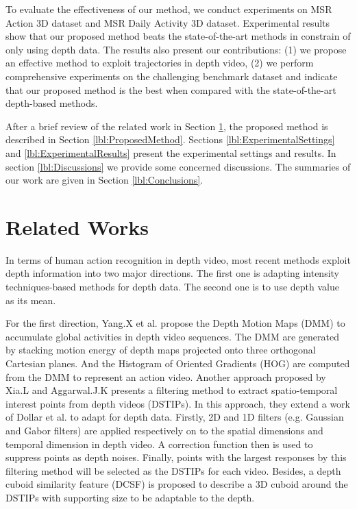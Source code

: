 \documentclass[review]{elsarticle}
\begin{document}
To evaluate the effectiveness of our method, we conduct experiments on MSR Action 3D dataset and MSR Daily Activity 3D dataset.
Experimental results show that our proposed method beats the state-of-the-art methods in constrain of only using depth data.
The results also present our contributions: (1) we propose an effective method to exploit trajectories in depth video, (2) we perform comprehensive experiments on the challenging benchmark dataset and indicate that our proposed method is the best when compared with the state-of-the-art depth-based methods.

After a brief review of the related work in Section \ref{lbl:RelatedWorks}, the proposed method is described in Section \ref{lbl:ProposedMethod}. Sections \ref{lbl:ExperimentalSettings} and \ref{lbl:ExperimentalResults} present the experimental settings and results. In section \ref{lbl:Discussions} we provide some concerned discussions. The summaries of our work are given in Section \ref{lbl:Conclusions}.

\section{Related Works}
\label{lbl:RelatedWorks}

In terms of human action recognition in depth video, most recent methods exploit depth information into two major directions. The first one is adapting intensity techniques-based methods for depth data. The second one is to use depth value as its mean.

For the first direction, Yang.X et al. \cite{yang2012recognizing} propose the Depth Motion Maps (DMM) to accumulate global activities in depth video sequences. The DMM are generated by stacking motion energy of depth maps projected onto three orthogonal Cartesian planes. And the Histogram of Oriented Gradients (HOG) \cite{dalal2005histograms} are computed from the DMM to represent an action video. Another approach proposed by Xia.L and Aggarwal.J.K \cite{xia2013spatio} presents a filtering method to extract spatio-temporal interest points from depth videos (DSTIPs). In this approach, they extend a work of Dollar et al. \cite{dollar2005behavior} to adapt for depth data. Firstly, 2D and 1D filters (e.g. Gaussian and Gabor filters) are applied respectively on to the spatial dimensions and temporal dimension in depth video. A correction function then is used to suppress points as depth noises. Finally, points with the largest responses by this filtering method will be selected as the DSTIPs for each video. Besides, a depth cuboid similarity feature (DCSF) is proposed to describe a 3D cuboid around the DSTIPs with supporting size to be adaptable to the depth.
\end{document}
